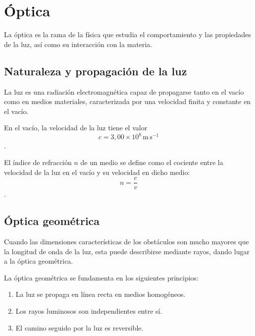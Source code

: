 \documentclass[10pt]{article}
\begin{document}
\section{Óptica}

La óptica es la rama de la física que estudia el comportamiento y las propiedades de la luz, así como su interacción con la materia.

\subsection{Naturaleza y propagación de la luz}

\begin{definition}[Luz]
  La luz es una radiación electromagnética capaz de propagarse tanto en el vacío como en medios materiales, caracterizada por una velocidad finita y constante en el vacío.
\end{definition}

\begin{remark}
  En el vacío, la velocidad de la luz tiene el valor
  \[ c = 3{,}00 \times 10^{8}\,\mathrm{m\,s^{-1}} \].
\end{remark}

\begin{definition}
  El índice de refracción $n$ de un medio se define como el cociente entre la velocidad de la luz en el vacío y su velocidad en dicho medio:
  \[ n = \frac{c}{v} \].
\end{definition}

\subsection{Óptica geométrica}

Cuando las dimensiones características de los obstáculos son mucho mayores que la longitud de onda de la luz, esta puede describirse mediante rayos, dando lugar a la óptica geométrica.

\begin{definition}
  La óptica geométrica se fundamenta en los siguientes principios:
  \begin{enumerate}
    \item La luz se propaga en línea recta en medios homogéneos.
    \item Los rayos luminosos son independientes entre sí.
    \item El camino seguido por la luz es reversible.
  \end{enumerate}
\end{definition}
\end{document}
